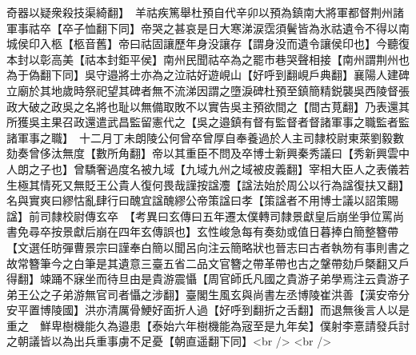 奇器以疑衆殺技渠綺翻】　羊祜疾篤舉杜預自代辛卯以預為鎮南大將軍都督荆州諸軍事祜卒【卒子恤翻下同】帝哭之甚哀是日大寒涕涙霑須鬢皆為氷祜遺令不得以南城侯印入柩【柩音舊】帝曰祜固讓歷年身没讓存【謂身没而遺令讓侯印也】今聽復本封以彰高美【祜本封鉅平侯】南州民聞祜卒為之罷市巷哭聲相接【南州謂荆州也為于偽翻下同】吳守邉將士亦為之泣祜好遊峴山【好呼到翻峴戶典翻】襄陽人建碑立廟於其地歲時祭祀望其碑者無不流涕因謂之墮淚碑杜預至鎮簡精鋭襲吳西陵督張政大破之政吳之名將也耻以無備取敗不以實告吳主預欲間之【間古莧翻】乃表還其所獲吳主果召政還遣武昌監留憲代之【吳之邉鎮有督有監督者督諸軍事之職監者監諸軍事之職】　十二月丁未朗陵公何曾卒曾厚自奉養過於人主司隸校尉東萊劉毅數劾奏曾侈汰無度【數所角翻】帝以其重臣不問及卒博士新興秦秀議曰【秀新興雲中人朗之子也】曾驕奢過度名被九域【九域九州之域被皮義翻】宰相大臣人之表儀若生極其情死又無貶王公貴人復何畏哉謹按諡灋【諡法始於周公以行為諡復扶又翻】名與實爽曰繆怙亂肆行曰醜宜諡醜繆公帝策諡曰孝【策諡者不用博士議以詔策賜諡】前司隸校尉傳玄卒　【考異曰玄傳曰五年遷太僕轉司隸景獻皇后崩坐爭位罵尚書免尋卒按景獻后崩在四年玄傳誤也】玄性峻急每有奏劾或值日暮捧白簡整簪帶【文選任昉彈曹景宗曰謹奉白簡以聞呂向注云簡略狀也晉志曰古者執笏有事則書之故常簪筆今之白筆是其遺意三臺五省二品文官簪之帶革帶也古之鞶帶劾戶槩翻又戶得翻】竦踊不寐坐而待旦由是貴游震懾【周官師氏凡國之貴游子弟學焉注云貴游子弟王公之子弟游無官司者懾之涉翻】臺閣生風玄與尚書左丞博陵崔洪善【漢安帝分安平置博陵國】洪亦清厲骨鯁好面折人過【好呼到翻折之舌翻】而退無後言人以是重之　鮮卑樹機能久為邉患【泰始六年樹機能為宼至是九年矣】僕射李憙請發兵討之朝議皆以為出兵重事虜不足憂【朝直遥翻下同】<br />
<br />
